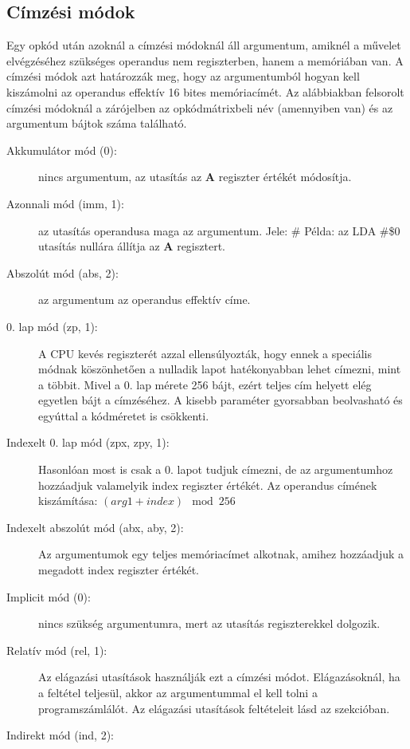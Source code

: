 \subsection{Címzési módok \cite{6502desc} \cite{cpuref}}

Egy opkód után azoknál a címzési módoknál áll argumentum, amiknél a művelet elvégzéséhez 
szükséges operandus nem regiszterben, hanem a memóriában van. A címzési módok azt határozzák meg, hogy az argumentumból hogyan kell kiszámolni az operandus effektív 16 bites memóriacímét. Az alábbiakban felsorolt  címzési módoknál a zárójelben az opkódmátrixbeli név (amennyiben van) és az argumentum bájtok száma található.  


\begin{description}
	\item[Akkumulátor mód (0):] nincs argumentum, az utasítás az \textbf{A} regiszter értékét módosítja.
	\item[Azonnali mód (imm, 1):] az utasítás operandusa maga az argumentum. Jele: \#
	\newline
	Példa: az LDA \#\$0 utasítás nullára állítja az \textbf{A} regisztert.
	\item[Abszolút mód (abs, 2):] az argumentum az operandus effektív címe.
	\item[0. lap mód (zp, 1):] A CPU kevés regiszterét azzal ellensúlyozták, hogy ennek a speciális módnak köszönhetően a nulladik lapot hatékonyabban lehet címezni, mint a többit. 
	Mivel a 0. lap mérete 256 bájt, ezért teljes cím helyett elég egyetlen bájt a címzéséhez.
	A kisebb paraméter gyorsabban beolvasható és egyúttal a kódméretet is csökkenti.
	\item[Indexelt 0. lap mód (zpx, zpy, 1):]
	Hasonlóan most is csak a 0. lapot tudjuk címezni, de az argumentumhoz hozzáadjuk valamelyik index regiszter értékét.
	Az operandus címének kiszámítása: $ (arg1 + index) \mod 256 $
	\item[Indexelt abszolút mód (abx, aby, 2):] Az argumentumok egy teljes memóriacímet alkotnak, amihez hozzáadjuk a megadott index regiszter értékét. 
	\item[Implicit mód (0):] nincs szükség argumentumra, mert az utasítás regiszterekkel dolgozik.
	\item[Relatív mód (rel, 1):] Az elágazási utasítások használják ezt a címzési módot. Elágazásoknál, ha a feltétel teljesül, akkor az argumentummal el kell tolni a programszámlálót. Az elágazási utasítások feltételeit lásd az \emph{} szekcióban.
	\item[Indirekt mód (ind, 2):] 

\end{description}
